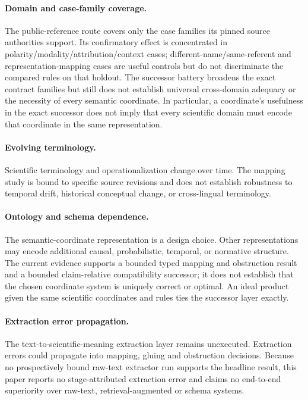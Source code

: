 \paragraph{Domain and case-family coverage.}
The public-reference route covers only the case families its pinned source
authorities support. Its confirmatory effect is concentrated in
polarity/modality/attribution/context cases; different-name/same-referent and
representation-mapping cases are useful controls but do not discriminate the
compared rules on that holdout. The successor battery broadens the exact
contract families but still does not establish universal cross-domain adequacy
or the necessity of every semantic coordinate. In particular, a coordinate's
usefulness in the exact successor does not imply that every scientific domain
must encode that coordinate in the same representation.

\paragraph{Evolving terminology.}
Scientific terminology and operationalization change over time. The mapping
study is bound to specific source revisions and does not establish robustness
to temporal drift, historical conceptual change, or cross-lingual terminology.

\paragraph{Ontology and schema dependence.}
The semantic-coordinate representation is a design choice. Other
representations may encode additional causal, probabilistic, temporal, or
normative structure. The current evidence supports a bounded typed mapping and
obstruction result and a bounded claim-relative compatibility successor; it
does not establish that the chosen coordinate system is uniquely correct or
optimal. An ideal product given the same scientific coordinates and rules ties
the successor layer exactly.

\paragraph{Extraction error propagation.}
The text-to-scientific-meaning extraction layer remains unexecuted. Extraction
errors could propagate into mapping, gluing and obstruction decisions. Because
no prospectively bound raw-text extractor run supports the headline result,
this paper reports no stage-attributed extraction error and claims no
end-to-end superiority over raw-text, retrieval-augmented or schema systems.

